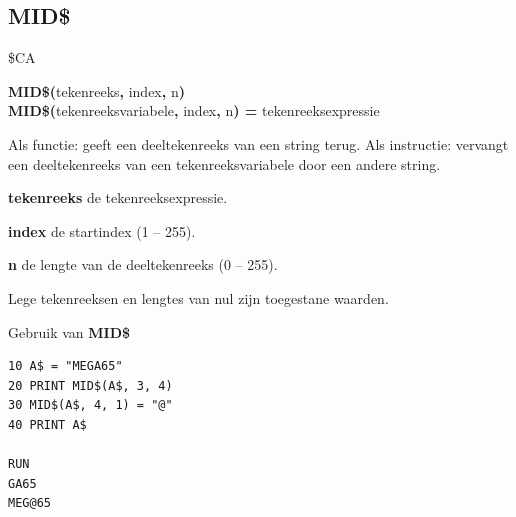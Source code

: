 \subsection{MID\$}
\begin{description}[leftmargin=2cm,style=nextline]
\item [Token:]    \$CA

\item [Formaat:]   {\bf MID\$(}tekenreeks{\bf,} index{\bf,} n{\bf)} \\                 {\bf MID\$(}tekenreeksvariabele{\bf,} index{\bf,} n{\bf) =} tekenreeksexpressie

\item [Gebruik:]    Als functie: geeft een deeltekenreeks van een string terug. Als instructie: vervangt een deeltekenreeks van een tekenreeksvariabele door een andere string.

                  {\bf tekenreeks} de tekenreeksexpressie.

                  {\bf index} de startindex (1 -- 255).

                  {\bf n} de lengte van de deeltekenreeks (0 -- 255).

\item [Opmerkingen:]  Lege tekenreeksen en lengtes van nul zijn toegestane waarden.

\item [Voorbeeld:]  Gebruik van {\bf MID\$}

\begin{tcolorbox}[colback=black,coltext=white]
\verbatimfont{\codefont}
\begin{verbatim}
10 A$ = "MEGA65"
20 PRINT MID$(A$, 3, 4)
30 MID$(A$, 4, 1) = "@"
40 PRINT A$

RUN
GA65
MEG@65
\end{verbatim}
\end{tcolorbox}
\end{description}


\newpage
